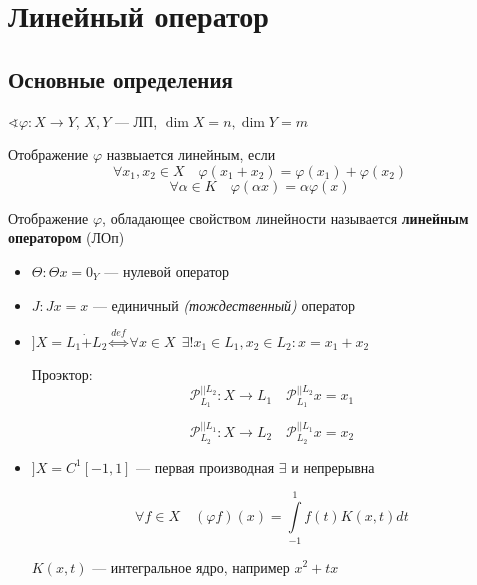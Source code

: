 

\cfoot{}



\section{Линейный оператор}

\subsection{Основные определения}

$\sphericalangle \varphi : X\to Y$, $X, Y$ --- ЛП, $\dim X = n, \dim Y = m$

\begin{definition}
    Отображение $\varphi$ назвыается линейным, если
    $$\forall x_1,x_2\in X \quad \varphi(x_1+x_2)=\varphi(x_1)+\varphi(x_2)$$
    $$\forall \alpha\in K \quad \varphi(\alpha x) = \alpha \varphi (x)$$
\end{definition}

\begin{definition}
    Отображение $\varphi$, обладающее свойством линейности называется \textbf{линейным оператором} (ЛОп)
\end{definition}

\begin{example}
    \begin{itemize}
        \item $\Theta : \Theta x = 0_Y$ --- нулевой оператор
        \item $J : Jx = x$ --- единичный \textit{(тождественный)} оператор
        \item $] X = L_1 \dot+ L_2 \stackrel{def}{\Leftrightarrow} \forall x\in X \ \ \exists! x_1\in L_1, x_2\in L_2 : x = x_1 + x_2$
        
        Проэктор: $$\mathcal{P}_{L_1}^{||L_2} : X\to L_1 \quad \mathcal{P}_{L_1}^{||L_2} x = x_1$$

        $$\mathcal{P}_{L_2}^{||L_1} : X\to L_2 \quad \mathcal{P}_{L_2}^{||L_1} x = x_2$$
        
        \item $] X = C^1[-1, 1]$ --- первая производная $\exists$ и непрерывна
        
        $$\forall f\in X \quad (\varphi f)(x) = \int\limits_{-1}^1 f(t) K(x, t) dt$$

        $K(x,t)$ --- интегральное ядро, например $x^2+tx$
    \end{itemize}
\end{example}

